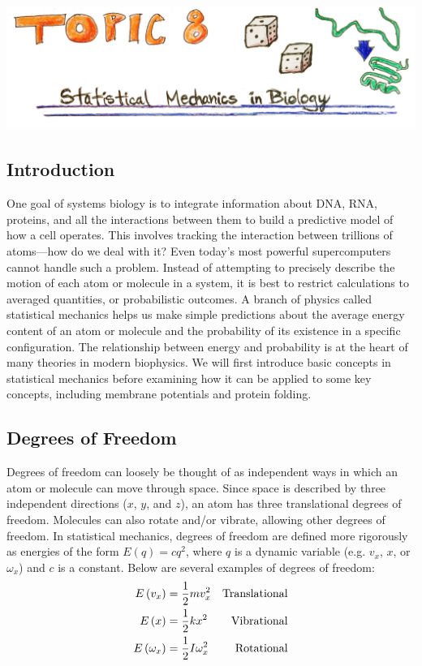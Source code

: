 \setcounter{chapter}{8}
\setcounter{section}{0}
\setcounter{figure}{0}
\setcounter{equation}{0}
\setcounter{table}{0}
\chapter*{\includegraphics[width=\textwidth]{./figures/Topic8/Topic8.jpg}}

\section{Introduction}
One goal of systems biology is to integrate information about DNA, RNA, proteins, and all the interactions between them to build a predictive model of how a cell operates.  This involves tracking the interaction between trillions of atoms—how do we deal with it?  
Even today’s most powerful supercomputers cannot handle such a problem.  Instead of attempting to precisely describe the motion of each atom or molecule in a system, it is best to restrict calculations to averaged quantities, or probabilistic outcomes.  A branch of physics called statistical mechanics helps us make simple predictions about the average energy content of an atom or molecule and the probability of its existence in a specific configuration.  
The relationship between energy and probability is at the heart of many theories in modern biophysics.  We will first introduce basic concepts in statistical mechanics before examining how it can be applied to some key concepts, including membrane potentials and protein folding.

\section{Degrees of Freedom}

Degrees of freedom can loosely be thought of as independent ways in which an atom or molecule can move through space.  Since space is described by three independent directions ($x$, $y$, and $z$), an atom has three translational degrees of freedom.  Molecules can also rotate and/or vibrate, allowing other degrees of freedom.  In statistical mechanics, degrees of freedom are defined more rigorously as energies of the form $E(q) = cq^2$, where $q$ is a dynamic variable (e.g. $v_x$, $x$, or $\omega_x$) and $c$ is a constant.  Below are several examples of degrees of freedom:
\begin{align}
E\left(v_x\right) &= \frac{1}{2}mv_x^2 &{\rm Translational}\nonumber\\
E\left(x\right) &= \frac{1}{2}kx^2 &{\rm Vibrational}\nonumber\\
E\left(\omega_x\right) &= \frac{1}{2}I\omega_x^2 &{\rm Rotational}\nonumber
\end{align}

